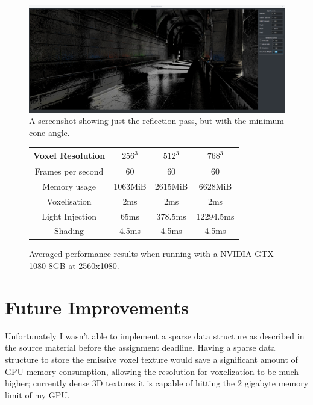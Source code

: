 \documentclass[]{acmsiggraph}
\begin{document}
\begin{figure}[htbp]\centering
 \includegraphics[width=1.0\linewidth]{images/reflection_only_no_roughness}
 \caption{A screenshot showing just the reflection pass, but with the minimum cone angle.}
\end{figure}

\begin{figure}[htbp]\centering
\begin{center}
 \begin{tabular}{|c|c|c|c|}
 \hline
 Voxel Resolution & $256^3$ & $512^3$ & $768^3$ \\
 \hline
 \hline
 Frames per second & 60 & 60 & 60 \\
 \hline
 Memory usage & 1063MiB & 2615MiB & 6628MiB \\
 \hline
 Voxelisation & 2ms & 2ms & 2ms \\
 \hline
 Light Injection & 65ms & 378.5ms & 12294.5ms\\
 \hline
 Shading & 4.5ms & 4.5ms & 4.5ms \\
 \hline
 \end{tabular}
 \caption{Averaged performance results when running with a NVIDIA GTX 1080 8GB at 2560x1080.}
\end{center}
\end{figure}

\section{Future Improvements}

Unfortunately I wasn't able to implement a sparse data structure as described in the source material \cite{crassinneyretsainzgreeneisemann2011} before the assignment deadline. Having a sparse data structure to store the emissive voxel texture would save a significant amount of GPU memory consumption, allowing the resolution for voxelization to be much higher; currently dense 3D textures it is capable of hitting the 2 gigabyte memory limit of my GPU.
\end{document}
